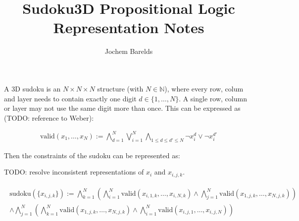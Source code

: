 \documentclass[11pt]{article}
\title{\textbf{Sudoku3D Propositional Logic Representation Notes}}
\author{Jochem Barelds}
\date{}
\begin{document}
\maketitle

A 3D sudoku is an $N \times N \times N$ structure (with $N \in \mathbb{N}$), where every row, colum and layer needs to contain exactly one digit $d \in \{1, \hdots, N\}$. A single row, column or layer may not use the same digit more than once. This can be expressed as (TODO: reference to Weber):

\begin{align}
	\text{valid}(x_1, \hdots, x_N) := \bigwedge_{d=1}^{N} \bigvee_{i=1}^{N} \bigwedge_{1 \leq d \leq d' \leq N} \neg x_i^{d} \vee \neg x_i^{d'} 
\end{align}

Then the constraints of the sudoku can be represented as:

TODO: resolve inconsistent representations of $x_i$ and $x_{i,j,k}$.

\begin{align}
\begin{split}
	\text{sudoku}(\{x_{i,j,k}\}) := \bigwedge_{k=1}^{N} (\bigwedge_{i=1}^{N} \text{valid}(x_{i,1,k}, \hdots, x_{i,N,k}) \wedge \bigwedge_{j=1}^{N} \text{valid}(x_{1,j,k}, \hdots, x_{N,j,k})) \\
	\wedge \bigwedge_{j=1}^{N} (\bigwedge_{k=1}^{N} \text{valid}(x_{1,j,k}, \hdots, x_{N,j,k}) \wedge \bigwedge_{i=1}^{N} \text{valid}(x_{i,j,1}, \hdots, x_{i,j,N}))
\end{split}
\end{align}
\end{document}
